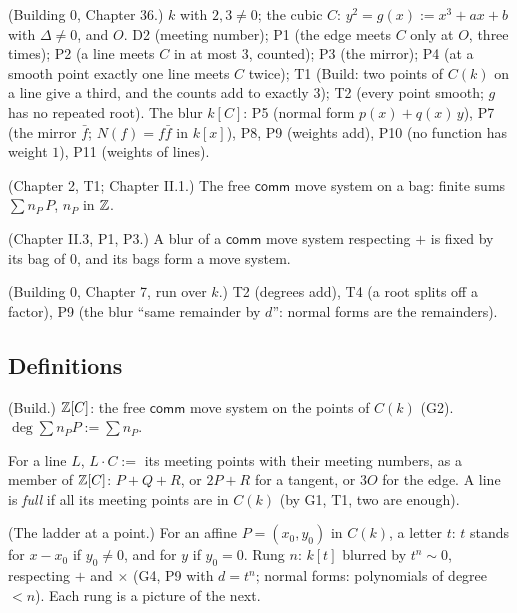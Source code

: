 \begin{lines}
\item[\lab{G1}] (Building 0, Chapter 36.) $k$ with $2, 3 \ne 0$; the cubic $C$: $y^2 = g(x) := x^3 + ax + b$ with $\Delta \ne 0$, and $O$. D2 (meeting number); P1 (the edge meets $C$ only at $O$, three times); P2 (a line meets $C$ in at most $3$, counted); P3 (the mirror); P4 (at a smooth point exactly one line meets $C$ twice); T1 (Build: two points of $C(k)$ on a line give a third, and the counts add to exactly $3$); T2 (every point smooth; $g$ has no repeated root). The blur $k[C]$: P5 (normal form $p(x) + q(x)\,y$), P7 (the mirror $\bar f$; $N(f) = f \bar f$ in $k[x]$), P8, P9 (weights add), P10 (no function has weight $1$), P11 (weights of lines).
\item[\lab{G2}] (Chapter 2, T1; Chapter II.1.) The free $\mathsf{comm}$ move system on a bag: finite sums $\sum n_P\,P$, $n_P$ in $\mathbb{Z}$.
\item[\lab{G3}] (Chapter II.3, P1, P3.) A blur of a $\mathsf{comm}$ move system respecting $+$ is fixed by its bag of $0$, and its bags form a move system.
\item[\lab{G4}] (Building 0, Chapter 7, run over $k$.) T2 (degrees add), T4 (a root splits off a factor), P9 (the blur ``same remainder by $d$'': normal forms are the remainders).
\end{lines}

\subsection*{Definitions}

\begin{lines}
\item[\lab{D1}] (Build.) $\mathbb{Z}[C]$: the free $\mathsf{comm}$ move system on the points of $C(k)$ (G2). \ $\deg \sum n_P P := \sum n_P$.
\item[\lab{D2}] For a line $L$, $L \cdot C := $ its meeting points with their meeting numbers, as a member of $\mathbb{Z}[C]$: $P + Q + R$, or $2P + R$ for a tangent, or $3O$ for the edge. A line is \emph{full} if all its meeting points are in $C(k)$ (by G1, T1, two are enough).
\item[\lab{D3}] (The ladder at a point.) For an affine $P = (x_0, y_0)$ in $C(k)$, a letter $t$: $t$ stands for $x - x_0$ if $y_0 \ne 0$, and for $y$ if $y_0 = 0$. Rung $n$: $k[t]$ blurred by $t^n \sim 0$, respecting $+$ and $\times$ (G4, P9 with $d = t^n$; normal forms: polynomials of degree $< n$). Each rung is a picture of the next.
\end{lines}


